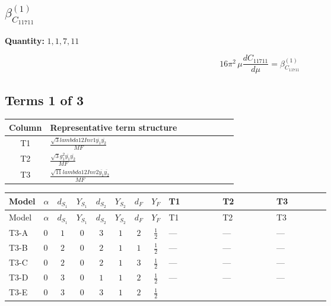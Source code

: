 \documentclass[8pt]{article}
\begin{document}
\begin{landscape}
\section*{$\beta_{C_{11711}}^{(1)}$}
\noindent\textbf{Quantity: }$\mathrm{1,1,7,11}$\par\smallskip
\[16\pi^2\,\mu\frac{d C_{11711}}{d\mu}=\beta_{C_{11711}}^{(1)}\]
\subsection*{Terms 1 of 3}
\begin{center}
\begin{tabular}{@{}c >{\raggedright\arraybackslash}p{0.82\linewidth}@{}}
\toprule
Column & Representative term structure \\
\midrule
T1 & \(\displaystyle \frac{\sqrt{3} lambda12Inv1 \overline{y_{1}} \overline{y_{2}}}{MF}\) \\
\midrule
T2 & \(\displaystyle \frac{\sqrt{3} g_{1}^{2} \overline{y_{1}} \overline{y_{2}}}{MF}\) \\
\midrule
T3 & \(\displaystyle \frac{\sqrt{11} lambda12Inv2 \overline{y_{1}} \overline{y_{2}}}{MF}\) \\
\midrule
\bottomrule
\end{tabular}
\end{center}
\smallskip
\tiny
\begin{longtable}{@{}llcccccc >{\raggedright\arraybackslash}p{0.21\linewidth} >{\raggedright\arraybackslash}p{0.21\linewidth} >{\raggedright\arraybackslash}p{0.21\linewidth}@{}}
\toprule
Model & $\alpha$ & $d_{S_1}$ & $Y_{S_1}$ & $d_{S_2}$ & $Y_{S_2}$ & $d_F$ & $Y_F$ & T1 & T2 & T3 \\
\midrule
\endfirsthead
\toprule
Model & $\alpha$ & $d_{S_1}$ & $Y_{S_1}$ & $d_{S_2}$ & $Y_{S_2}$ & $d_F$ & $Y_F$ & T1 & T2 & T3 \\
\midrule
\endhead
T3-A & $0$ & $1$ & $0$ & $3$ & $1$ & $2$ & $\frac{1}{2}$ & --- & --- & --- \\
\midrule
T3-B & $0$ & $2$ & $0$ & $2$ & $1$ & $1$ & $\frac{1}{2}$ & --- & --- & --- \\
\midrule
T3-C & $0$ & $2$ & $0$ & $2$ & $1$ & $3$ & $\frac{1}{2}$ & --- & --- & --- \\
\midrule
T3-D & $0$ & $3$ & $0$ & $1$ & $1$ & $2$ & $\frac{1}{2}$ & --- & --- & --- \\
\midrule
T3-E & $0$ & $3$ & $0$ & $3$ & $1$ & $2$ & $\frac{1}{2}$ & \scriptsize\adjustbox{max width=\linewidth}{$\begin{gathered} - \frac{\sqrt{3} lambda12Inv1 \overline{y_{1}} \overline{y_{2}}}{6 MF}\end{gathered}$} & \scriptsize\adjustbox{max width=\linewidth}{$\begin{gathered} \frac{\sqrt{3} g_{1}^{2} \overline{y_{1}} \overline{y_{2}}}{8 MF}\end{gathered}$} & \scriptsize\adjustbox{max width=\linewidth}{$\begin{gathered} \frac{3 \sqrt{11} lambda12Inv2 \overline{y_{1}} \overline{y_{2}}}{22 MF}\end{gathered}$} \\

\end{longtable}
\end{landscape}
\end{document}
